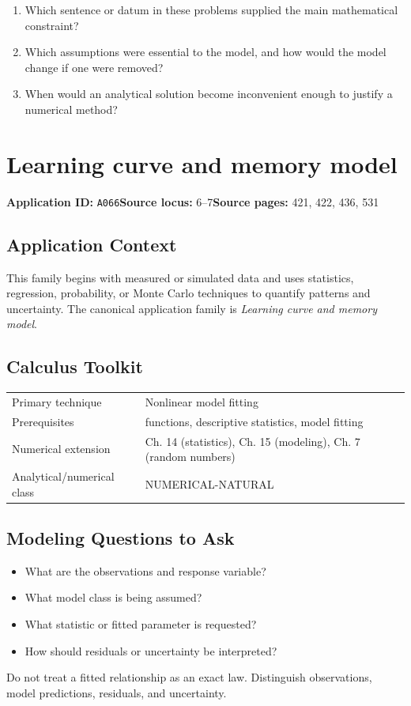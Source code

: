 \documentclass[11pt]{book}
\newcommand{\pid}[1]{\texttt{#1}}
\begin{document}
\begin{reflectionbox}\begin{enumerate}
\item Which sentence or datum in these problems supplied the main mathematical constraint?
\item Which assumptions were essential to the model, and how would the model change if one were removed?
\item When would an analytical solution become inconvenient enough to justify a numerical method?
\end{enumerate}\end{reflectionbox}
\chapter{Learning curve and memory model}\label{app:A066}
\textbf{Application ID:} \pid{A066}\quad \textbf{Source locus:} 6–7\quad \textbf{Source pages:} 421, 422, 436, 531
\section*{Application Context}
This family begins with measured or simulated data and uses statistics, regression, probability, or Monte Carlo techniques to quantify patterns and uncertainty. The canonical application family is \emph{Learning curve and memory model}.
\section*{Calculus Toolkit}
\begin{tabularx}{\textwidth}{@{}lX@{}}\toprule
Primary technique & Nonlinear model fitting \\
Prerequisites & functions, descriptive statistics, model fitting \\
Numerical extension & Ch. 14 (statistics), Ch. 15 (modeling), Ch. 7 (random numbers) \\
Analytical/numerical class & NUMERICAL-NATURAL \\
\bottomrule\end{tabularx}
\section*{Modeling Questions to Ask}\begin{itemize}
\item What are the observations and response variable?
\item What model class is being assumed?
\item What statistic or fitted parameter is requested?
\item How should residuals or uncertainty be interpreted?
\end{itemize}
\begin{errorbox}Do not treat a fitted relationship as an exact law. Distinguish observations, model predictions, residuals, and uncertainty.\end{errorbox}
\end{document}
